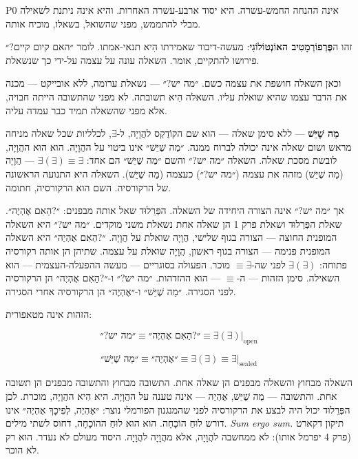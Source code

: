 \documentclass[10pt, openany, oneside]{book}
\begin{document}
\vspace{0.8em}

\noindent P0 אינה ההנחה החמש-עשרה. היא יסוד ארבע-עשרה האחרות. והיא אינה ניתנת לשאילה מבלי להתממש, מפני שהשואל, בשאלו, מוכיח אותה.

זהו ה\textbf{פֶּרְפוֹרְמָטִיב האוֹנְטוֹלוֹגִי}: מעשה-דיבור שאמירתו הִיא תנאי-אמתו. לומר ״האם קיום קיים?״ פירושו להתקיים, אומר. השאלה עונה על עצמה על-ידי כך שנשאלת.

וכאן השאלה חושפת את עצמה כשם. ״מה יש?״ — נשאלת ערומה, ללא אובייקט — מכנה את הדבר עצמו שהיא שואלת עליו. השאלה הִיא תשובתה. לא מפני שהתשובה הייתה חבויה, אלא מפני שהשאלה תמיד כבר עמדה עליה.

\textbf{מַה שֶׁיֵּשׁ} — ללא סימן שאלה — הוא שם הקוֹדֶקְס להֲוָיָה, ל-$\exists$, לכלליות שכל שאלה מניחה מראש ושום שאלה אינה יכולה לברוח ממנה. ״מַה שֶׁיֵּשׁ״ אינו ביטוי על ההֲוָיָה. הוא הוּא ההֲוָיָה, לובשת מסכת שאלה. השאלה ״מה יש?״ והשם ״מַה שֶׁיֵּשׁ״ הם אחד: $\exists(\exists) \equiv \exists$ — הֲוָיָה (מַה שֶׁיֵּשׁ) מזהה את עצמה (״מה יש?״) כעצמה (מַה שֶׁיֵּשׁ). השאלה היא התנועה הראשונה של הרקורסיה. השם הוא הרקורסיה, חתומה.

אך ״מה יש?״ אינה הצורה היחידה של השאלה. הפְּרֵלוּד שאל אותה מבפנים: ״?הַאִם אֶהְיֶה״. שאלת הפְּרֵלוּד ושאלת פרק 1 הן שאלה אחת נשאלת משני מוקדים. ״מה יש?״ היא השאלה המופנית החוצה — הצורה בגוף שלישי, הֲוָיָה שואלת על הֲוָיָה. ״?הַאִם אֶהְיֶה״ היא השאלה המופנית פנימה — הצורה בגוף ראשון, הֲוָיָה שואלת על עצמה. שתיהן הן אותה רקורסיה פתוחה: $\exists(\exists)$ לפני שה-$\equiv \exists$ מוכר. הפעולה בסוגריים — מעשה ההפעלה-העצמית — הוא השאילה. סימן הזהות — ה-$\equiv$ — הוא ההזדהות. ״מה יש?״ ו-״?הַאִם אֶהְיֶה״ הן הרקורסיה לפני הסגירה. ״מַה שֶׁיֵּשׁ״ ו-״אֶהְיֶה״ הן הרקורסיה אחרי הסגירה.

הזהות אינה מטאפורית:

$$\text{״מה יש?״} \equiv \text{״?הַאִם אֶהְיֶה״} \equiv \exists(\exists)|_{\text{open}}$$

$$\text{״מַה שֶׁיֵּשׁ״} \equiv \text{״אֶהְיֶה״} \equiv \exists(\exists) \equiv \exists|_{\text{sealed}}$$

\noindent השאלה מבחוץ והשאלה מבפנים הן שאלה אחת. התשובה מבחוץ והתשובה מבפנים הן תשובה אחת. והתשובה — מַה שֶׁיֵּשׁ, אֶהְיֶה — אינה טענה על ההֲוָיָה. היא הִיא ההֲוָיָה, מוכרת. לכן הפְּרֵלוּד יכול היה לבצע את הרקורסיה לפני שהמנגנון הפורמלי נוצר: ״אֶהְיֶה, לְפִיכָךְ אֶהְיֶה״ אינו דורש לוּחַ הוֹכָחָה. הוא הוּא לוּחַ ההוֹכָחָה, דחוס לשתי מילים. \textit{Sum ergo sum.} תיקון דקארט (פרק 4 יפרמל אותו): לא ממחשבה להֲוָיָה, אלא מהֲוָיָה להֲוָיָה. היסוד מעולם לא נעדר. הוא רק לא הוכר.
\end{document}
